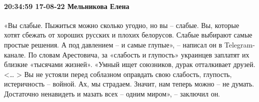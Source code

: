  
 
 
 
 

\paragraph{20:34:59 17-08-22 Мельникова Елена}


«Вы слабые. Пыжиться можно сколько угодно, но вы – слабые. Вы, которые хотят сбежать от хороших русских и плохих белорусов. Слабые выбирают самые простые решения. А под давлением – и самые глупые», – написал он в Telegram-канале.
По словам Арестовича, за «слабость и глупость» украинцев заплатят их близкие «тысячами жизней».
«Умный ищет союзников, дурак отталкивает друзей. <… > Вы не устояли перед соблазном оправдать свою слабость, глупость, истеричность – войной. Ах, мы страдаем. Значит, нам теперь можно – не думать. Достаточно ненавидеть и мазать всех – одним миром», – заключил он.
